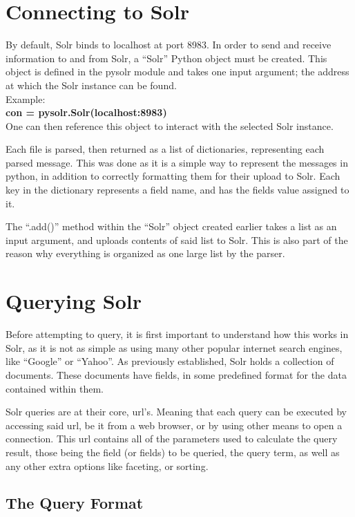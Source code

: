\documentclass[a4paper,english]{report}
\begin{document}
\section{Connecting to Solr}


By default, Solr binds to localhost at port 8983. In order to send and receive information to and from Solr, a “Solr” Python object must be created. This object is defined in the pysolr module and takes one input argument;  the address at which the Solr instance can be found.\\
Example:\\

\textbf{	con = pysolr.Solr(localhost:8983)}\\

One can then reference this object to interact with the selected Solr instance.

Each file is parsed, then returned as a list of dictionaries, representing each parsed message. This was done as it is a simple way to represent the messages in python, in addition to correctly formatting them for their upload to Solr.
Each key in the dictionary represents a field name,  and has the fields value assigned to it.


The “.add()” method within the “Solr” object created earlier takes a list as an input argument, and uploads contents of said list to Solr. This is also part of the reason why everything is organized as one large list by the parser.

\section{Querying Solr}

Before attempting to query, it is first important to understand how this works in Solr, as it is not as simple as using many other popular internet search engines, like “Google” or “Yahoo”. 
As previously established, Solr holds a collection of documents. These documents have fields, in some predefined format for the data contained within them.

Solr queries are at their core, url's. Meaning that each query can be executed by accessing said url, be it from a web browser, or by using other means to open a connection.
This url contains all of the parameters used to calculate the query result,
those being the field (or fields) to be queried, the query term, as well as any other extra options like faceting, or sorting.


\subsection{The Query Format}
\end{document}
